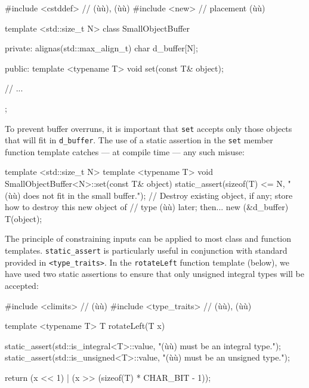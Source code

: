 %
%
\begin{emcppslisting}[emcppsbatch=e3]
#include <cstddef> // (ù{}ù), (ù{}ù)
#include <new>     // placement (ù{}ù)

template <std::size_t N>
class SmallObjectBuffer
{
private:
    alignas(std::max_align_t) char d_buffer[N];

public:
    template <typename T>
    void set(const T& object);

    // ...
};
\end{emcppslisting}


\noindent To prevent buffer overruns, it is important that \lstinline!set! accepts
only those objects that will fit in \lstinline!d_buffer!. The use of a
static assertion in the \lstinline!set! member function template catches
--- at compile time --- any such misuse:

\begin{emcppslisting}[emcppsbatch=e3]
template <std::size_t N>
template <typename T>
void SmallObjectBuffer<N>::set(const T& object)
{
    static_assert(sizeof(T) <= N, "(ù{}ù) does not fit in the small buffer.");
    // Destroy existing object, if any; store how to destroy this new object of
    // type (ù{}ù) later; then...
    new (&d_buffer) T(object);
}
\end{emcppslisting}



The principle of constraining inputs can be applied to most class and
function templates. \lstinline!static_assert! is particularly useful in
conjunction with standard  provided in
\lstinline!<type_traits>!. In the \lstinline!rotateLeft! function template
(below), we have used two static assertions to ensure that only unsigned
integral types will be accepted:

\begin{emcppslisting}
#include <climits>      // (ù{}ù)
#include <type_traits>  // (ù{}ù), (ù{}ù)

template <typename T>
T rotateLeft(T x)
{
    static_assert(std::is_integral<T>::value, "(ù{}ù) must be an integral type.");
    static_assert(std::is_unsigned<T>::value, "(ù{}ù) must be an unsigned type.");

    return (x << 1) | (x >> (sizeof(T) * CHAR_BIT - 1));
}
\end{emcppslisting}



